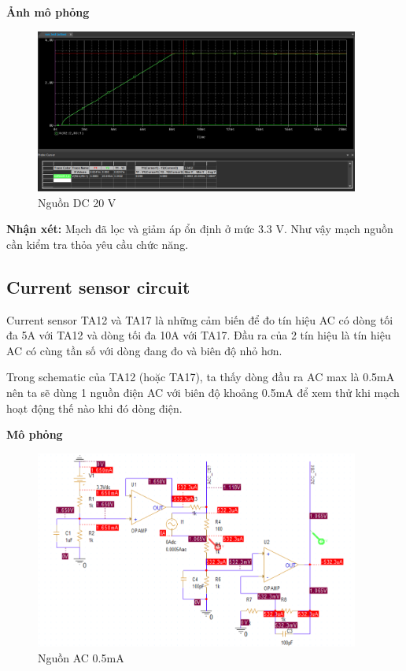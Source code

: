 \textbf{Ảnh mô phỏng}
\begin{figure}[ht]
    \centering
    \includegraphics[width=0.95\textwidth]{graphics/section4/f4.png}
    \caption{Nguồn DC 20 V}
\end{figure}

\textbf{Nhận xét: }Mạch đã lọc và giảm áp ổn định ở mức 3.3 V. Như vậy mạch nguồn cần kiểm tra thỏa yêu cầu chức năng.
\pagebreak
\subsection{Current sensor circuit}
Current sensor TA12 và TA17 là những cảm biến để đo tín hiệu AC có dòng tối đa 5A với TA12 và dòng tối đa 10A với TA17. Đầu ra của 2 tín hiệu là tín hiệu AC có cùng tần số với dòng đang đo và biên độ nhỏ hơn.

Trong schematic của TA12 (hoặc TA17), ta thấy dòng đầu ra AC max là 0.5mA nên ta sẽ dùng 1 nguồn điện AC với biên độ khoảng 0.5mA để xem thử khi mạch hoạt động thế nào khi đó dòng điện.

\textbf{Mô phỏng}

\begin{figure}[ht]
    \centering
    \includegraphics[width=0.95\textwidth]{graphics/section4/f6.png}
    \caption{Nguồn AC 0.5mA}
\end{figure}

